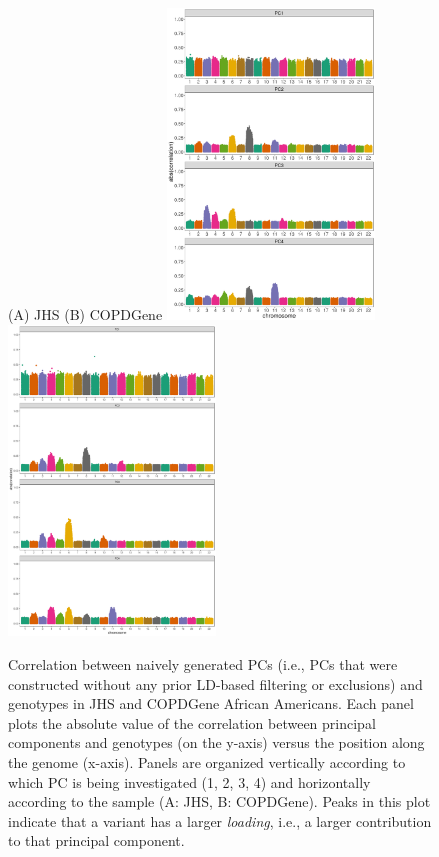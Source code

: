 \documentclass[12pt]{article}
\begin{document}
\begin{figure}
\hspace{0.3in} (A) JHS \hspace{2.4in} (B) COPDGene
\center
\includegraphics[width=0.49\textwidth]{figs/JHS/JHS_prune_FALSE_1_0_0.01_snprelate_corr_1}
\includegraphics[width=0.49\textwidth]{figs/COPD/COPD_prune_FALSE_1_0_0.01_snprelate_corr_1}
\caption{Correlation between naively generated PCs (i.e., PCs that were constructed without any prior LD-based filtering or exclusions) and genotypes in JHS and COPDGene African Americans. Each panel plots the absolute value of the correlation between principal components and genotypes (on the y-axis) versus the position along the genome (x-axis).  Panels are organized vertically according to which PC is being investigated (1, 2, 3, 4) and horizontally according to the sample (A: JHS, B: COPDGene). Peaks in this plot indicate that a variant has a larger \textit{loading}, i.e., a larger contribution to that principal component.}
\label{fig:corr-TOPMed}
\end{figure}
\end{document}
